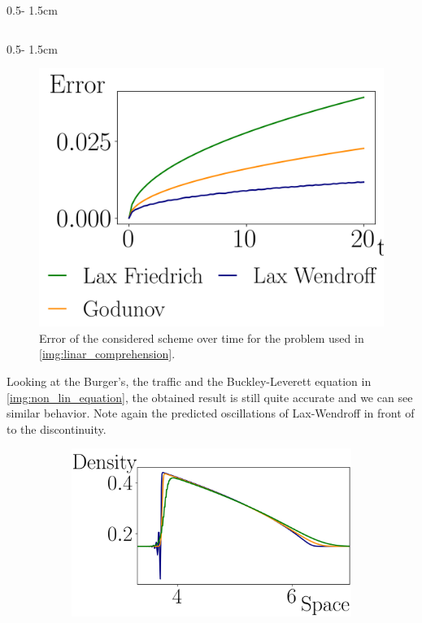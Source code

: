 \documentclass{uibposter}
\begin{document}
\begin{frame}[fragile]
\begin{columns}
\begin{column}{0.5\textwidth - 1.5cm}
\begin{column}{0.5\textwidth - 1.5cm}
   
    \begin{figure}
    	\includegraphics{fig/error_over_time.png}
    	\caption{Error of the considered scheme over time for the problem used in \cref{img:linar_comprehension}.}
    	\label{img:error_over_time}
    \end{figure}

Looking at the Burger's, the traffic and the Buckley-Leverett equation in \cref{img:non_lin_equation}, the obtained result is still quite accurate and we can see similar behavior. Note again the predicted oscillations of Lax-Wendroff in front of to the discontinuity.

\begin{figure}
	\begin{subfigure}{\textwidth}
	\includegraphics{fig/traffic_compare_.png}
	\end{subfigure}


\end{figure}
\end{column}
\end{column}
\end{columns}
\end{frame}
\end{document}
